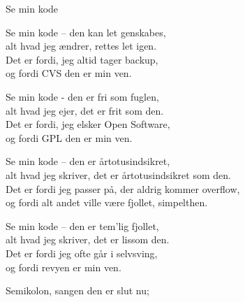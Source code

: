 \begin{song}{Se min kode}
  \begin{SBVerse}
    Se min kode – den kan let genskabes,\\
    alt hvad jeg ændrer, rettes let igen.\\
    Det er fordi, jeg altid tager backup,\\
    og fordi CVS den er min ven.
  \end{SBVerse}

  \begin{SBVerse}
    Se min kode - den er fri som fuglen,\\
    alt hvad jeg ejer, det er frit som den.\\
    Det er fordi, jeg elsker Open Software,\\
    og fordi GPL den er min ven.
  \end{SBVerse}

  \begin{SBVerse}
    Se min kode – den er årtotusindsikret,\\
    alt hvad jeg skriver, det er årtotusindsikret som den.\\
    Det er fordi jeg passer på, der aldrig kommer overflow,\\
    og fordi alt andet ville være fjollet, simpelthen.
  \end{SBVerse}

  \begin{SBVerse}
    Se min kode – den er tem’lig fjollet,\\
    alt hvad jeg skriver, det er lissom den.\\
    Det er fordi jeg ofte går i selvsving,\\
    og fordi revyen er min ven.
  \end{SBVerse}

  \begin{SBVerse}
    Semikolon, sangen den er slut nu;
  \end{SBVerse}
\end{song}
